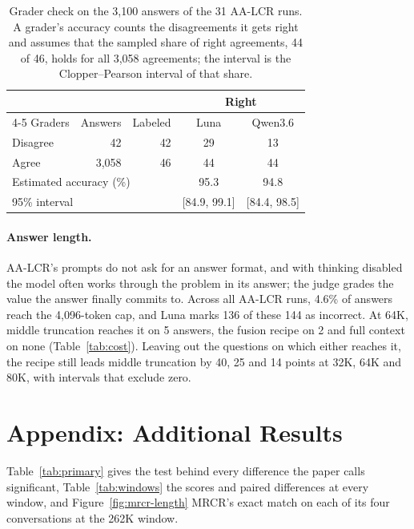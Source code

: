 \documentclass[letterpaper]{article} %
\newcommand{\recipe}{fusion recipe}
\begin{document}
\begin{table}[t]
\centering
\small
\setlength{\tabcolsep}{4pt}
\begin{tabular}{lrrcc}
\toprule
 & & & \multicolumn{2}{c}{Right} \\
\cmidrule(lr){4-5}
Graders & Answers & Labeled & Luna & Qwen3.6 \\
\midrule
Disagree & 42 & 42 & 29 & 13 \\
Agree & 3,058 & 46 & 44 & 44 \\
\midrule
\multicolumn{3}{l}{Estimated accuracy (\%)} & 95.3 & 94.8 \\
\multicolumn{3}{l}{95\% interval} & [84.9, 99.1] & [84.4, 98.5] \\
\bottomrule
\end{tabular}
\caption{Grader check on the 3,100 answers of the 31 AA-LCR runs. A grader's accuracy counts the disagreements it gets right and assumes that the sampled share of right agreements, 44 of 46, holds for all 3,058 agreements; the interval is the Clopper--Pearson interval of that share.}
\label{tab:grader}
\end{table}

\paragraph{Answer length.} AA-LCR's prompts do not ask for an answer format, and with thinking disabled the model often works through the problem in its answer; the judge grades the value the answer finally commits to. Across all AA-LCR runs, 4.6\% of answers reach the 4,096-token cap, and Luna marks 136 of these 144 as incorrect. At 64K, middle truncation reaches it on 5 answers, the \recipe{} on 2 and full context on none (Table~\ref{tab:cost}). Leaving out the questions on which either reaches it, the recipe still leads middle truncation by 40, 25 and 14 points at 32K, 64K and 80K, with intervals that exclude zero.

\section{Appendix: Additional Results}
Table~\ref{tab:primary} gives the test behind every difference the paper calls significant, Table~\ref{tab:windows} the scores and paired differences at every window, and Figure~\ref{fig:mrcr-length} MRCR's exact match on each of its four conversations at the 262K window.
\end{document}
